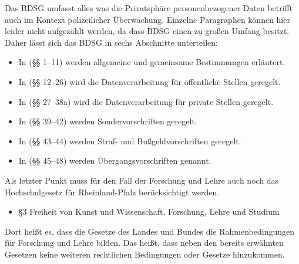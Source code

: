 \documentclass[10pt,a4paper]{article}
\begin{document}
Das BDSG umfasst alles was die Privatsphäre personenbezogener Daten betrifft auch im Kontext polizeilicher Überwachung. Einzelne Paragraphen können hier leider nicht aufgezählt werden, da dass BDSG einen zu großen Umfang besitzt. Daher lässt sich das BDSG in sechs Abschnitte unterteilen:
\begin{itemize}
	\item In (§§ 1–11) werden allgemeine und gemeinsame Bestimmungen erläutert.
	\item In (§§ 12–26) wird die Datenverarbeitung für öffentliche Stellen geregelt.
	\item In (§§ 27–38a) wird die Datenverarbeitung für private Stellen geregelt.
	\item In (§§ 39–42) werden Sondervorschriften geregelt.
	\item In (§§ 43–44) werden Straf- und Bußgeldvorschriften geregelt.
	\item In (§§ 45–48) werden Übergangsvorschriften genannt.
\end{itemize}
Als letzter Punkt muss für den Fall der Forschung und Lehre auch noch das Hochschulgesetz für Rheinland-Pfalz berücksichtigt werden. 
\begin{itemize}
	\item §3 Freiheit von Kunst und Wissenschaft, Forschung, Lehre und Studium
\end{itemize}
Dort heißt es, dass die Gesetze des Landes und Bundes die Rahmenbedingungen für Forschung und Lehre bilden. Das heißt, dass neben den bereits erwähnten Gesetzen keine weiteren rechtlichen Bedingungen oder Gesetze hinzukommen.
\end{document}
